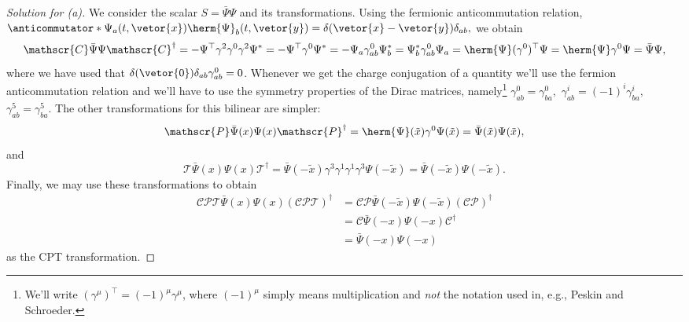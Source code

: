 \begin{proof}[Solution for (a)]
   We consider the scalar \(S = \bar{\Psi} \Psi\) and its transformations. Using the fermionic anticommutation relation, \(\anticommutator*{\Psi_a(t, \vetor{x})}{\herm{\Psi}_b(t, \vetor{y})} = \delta(\vetor{x} - \vetor{y}) \delta_{ab},\) we obtain
   \begin{equation*}
      \mathscr{C} \bar{\Psi} \Psi \mathscr{C}^\dag = - \Psi^\top \gamma^2 \gamma^0 \gamma^2 \Psi^* = -\Psi^\top \gamma^0 \Psi^* = - \Psi_a \gamma^0_{ab} \Psi^*_b = \Psi^*_b \gamma^0_{ab} \Psi_a = \herm{\Psi} (\gamma^0)^\top \Psi = \herm{\Psi} \gamma^0 \Psi = \bar{\Psi} \Psi,
   \end{equation*}
   where we have used that \(\delta(\vetor{0})\delta_{ab} \gamma^0_{ab} = 0\). Whenever we get the charge conjugation of a quantity we'll use the fermion anticommutation relation and we'll have to use the symmetry properties of the Dirac matrices, namely\footnote{We'll write \((\gamma^\mu)^\top = (-1)^\mu \gamma^\mu\), where \((-1)^\mu\) simply means multiplication and \emph{not} the notation used in, e.g., Peskin and Schroeder.} \(\gamma^0_{ab} = \gamma^0_{ba},\) \(\gamma^i_{ab} = (-1)^i\gamma^i_{ba},\) \(\gamma^5_{ab} = \gamma^5_{ba}.\) The other transformations for this bilinear are simpler:
   \begin{equation*}
      \mathscr{P} \bar{\Psi}(x)\Psi(x) \mathscr{P}^\dag = \herm{\Psi}(\tilde{x}) \gamma^0 \Psi(\tilde{x}) = \bar{\Psi}(\tilde{x}) \Psi(\tilde{x}),
   \end{equation*}
   and
   \begin{equation*}
      \mathscr{T} \bar{\Psi}(x)\Psi(x) \mathscr{T}^\dag = \bar{\Psi}(-\tilde{x}) \gamma^3 \gamma^1 \gamma^1 \gamma^3 \Psi(-\tilde{x}) = \bar{\Psi}(-\tilde{x})\Psi(-\tilde{x}).
   \end{equation*}
   Finally, we may use these transformations to obtain 
   \begin{align*}
      \mathscr{CPT} \bar{\Psi}(x)\Psi(x) (\mathscr{CPT})^\dag 
       &= \mathscr{CP} \bar{\Psi}(-\tilde{x}) \Psi(-\tilde{x}) (\mathscr{CP})^{\dag}\\
       &= \mathscr{C}\bar{\Psi}(-x) \Psi(-x) \mathscr{C}^\dag\\
       &= \bar{\Psi}(-x) \Psi(-x)
   \end{align*}
   as the CPT transformation.
\end{proof}
